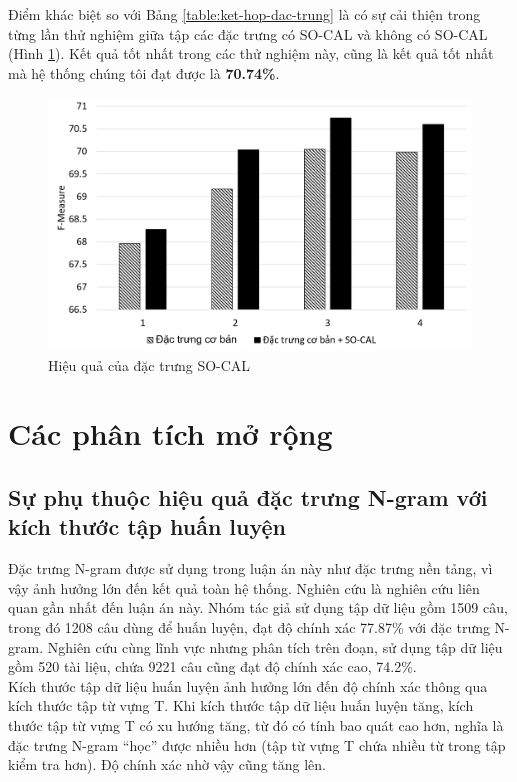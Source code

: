 Điểm khác biệt so với Bảng \ref{table:ket-hop-dac-trung} là có sự cải thiện trong từng lần thử nghiệm giữa tập các đặc trưng có SO-CAL và không có SO-CAL (Hình \ref{fig:socal-vs-co-ban}). Kết quả tốt nhất trong các thử nghiệm này, cũng là kết quả tốt nhất mà hệ thống chúng tôi đạt được là \textbf{70.74\%}.
\begin{figure}[h]
\centering
\includegraphics[scale=0.35]{../hinh/socal_vs_dac_trung_co_ban.png}
\caption{Hiệu quả của đặc trưng SO-CAL} \label{fig:socal-vs-co-ban}
\end{figure}
\section{Các phân tích mở rộng} \label{subsec:phan-tich-mo-rong}
\subsection*{Sự phụ thuộc hiệu quả đặc trưng N-gram với kích thước tập huấn luyện}
Đặc trưng N-gram được sử dụng trong luận án này như đặc trưng nền tảng, vì vậy ảnh hưởng lớn đến kết quả toàn hệ thống. Nghiên cứu  \cite{niu2005analysis} là nghiên cứu liên quan gần nhất đến luận án này. Nhóm tác giả sử dụng tập dữ liệu gồm 1509 câu, trong đó 1208 câu dùng để huấn luyện, đạt độ chính xác 77.87\% với đặc trưng N-gram. Nghiên cứu \cite{sarker2011outcome} cùng lĩnh vực nhưng phân tích trên đoạn, sử dụng tập dữ liệu gồm 520 tài liệu, chứa 9221 câu cũng đạt độ chính xác cao, 74.2\%.\\

Kích thước tập dữ liệu huấn luyện ảnh hưởng lớn đến độ chính xác thông qua kích thước tập từ vựng T. Khi kích thước tập dữ liệu huấn luyện tăng, kích thước tập từ vựng T có xu hướng tăng, từ đó có tính bao quát cao hơn, nghĩa là đặc trưng N-gram ``học'' được nhiều hơn (tập từ vựng T chứa nhiều từ trong tập kiểm tra hơn).  Độ chính xác nhờ vậy cũng tăng lên. \\

